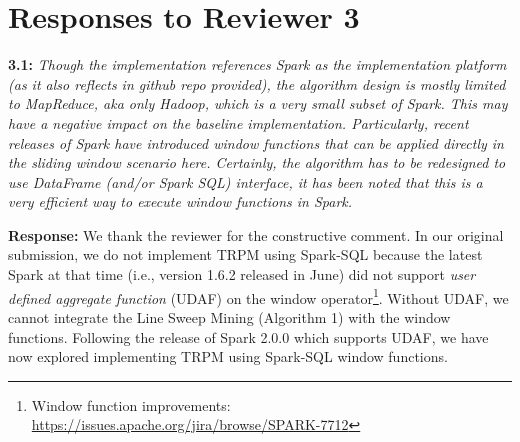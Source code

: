 \documentclass{vldb}
\begin{document}





\section{Responses to Reviewer 3}
\textbf{3.1:} \emph{Though the implementation references Spark as the implementation
platform (as it also reflects in github repo provided), the algorithm design is
mostly limited to MapReduce, aka only Hadoop, which is a very small subset of
Spark. This may have a negative impact on the baseline implementation.
Particularly, recent releases of Spark have introduced window functions that can
be applied directly in the sliding window scenario here. Certainly, the algorithm
has to be redesigned to use DataFrame (and/or Spark SQL) interface, it has
been noted that this is a very efficient way to execute window functions in
Spark.}


\textbf{Response:} We thank the reviewer for the constructive comment.
In our original submission,
we do not implement TRPM using Spark-SQL
because the latest Spark at that time (i.e., version 1.6.2 released in June)
did not support \textit{user defined aggregate function} (UDAF) on the window operator\footnote{Window function improvements: \url{https://issues.apache.org/jira/browse/SPARK-7712}}. 
Without UDAF, we cannot integrate the Line Sweep Mining (Algorithm 1) with the window functions. 
Following the release of Spark 2.0.0 which supports UDAF, we have now explored implementing TRPM using Spark-SQL window functions.
\end{document}
